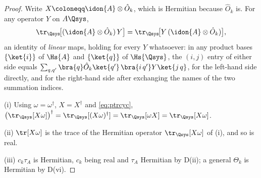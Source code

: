 \begin{proof}
Write $X\coloneqq\idon{A}\otimes\hat O_k$, which is Hermitian because
$\hat O_k$ is. For any operator $Y$ on $A\Qsys$,
\begin{equation}\label{eq:ptrcyc}
  \tr_{\Qsys}\!\big[(\idon{A}\otimes\hat O_k)\,Y\big]
  =\tr_{\Qsys}\!\big[Y\,(\idon{A}\otimes\hat O_k)\big] ,
\end{equation}
an identity of \emph{linear} maps, holding for every $Y$ whatsoever: in any
product bases $\{\ket{i}\}$ of $\Hs{A}$ and $\{\ket{q}\}$ of $\Hs{\Qsys}$,
the $(i,j)$ entry of either side equals
$\sum_{q,q'}\bra{q}\hat O_k\ket{q'}\,\bra{i\,q'}Y\ket{j\,q}$, for the
left-hand side directly, and for the right-hand side after exchanging the
names of the two summation indices.

(i) Using $\omega=\omega^{\dagger}$, $X=X^{\dagger}$ and \eqref{eq:ptrcyc},
$\big(\tr_{\Qsys}[X\omega]\big)^{\dagger}=\tr_{\Qsys}[(X\omega)^{\dagger}]
=\tr_{\Qsys}[\omega X]=\tr_{\Qsys}[X\omega]$.

(ii) $\tr[X\omega]$ is the trace of the Hermitian operator
$\tr_{\Qsys}[X\omega]$ of (i), and so is real.

(iii) $c_k\tau_A$ is Hermitian, $c_k$ being real and $\tau_A$ Hermitian by
D(ii); a general $\Theta_k$ is Hermitian by D(vi).
\end{proof}
